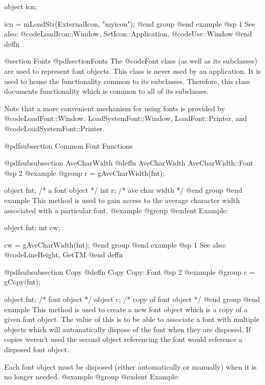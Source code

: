 object  icn;

icn = mLoadStr(ExternalIcon, "myicon");
@end group
@end example
@sp 1
See also:  @code{LoadIcon::Window, SetIcon::Application,}
        @code{Use::Window}
@end deffn





@section Fonts
@pdfsection{Fonts}
The @code{Font} class (as well as its subclasses) are used to represent
font objects.  This class is never used by an application.  It is used
to house the functionality common to its subclasses.  Therefore, this
class documents functionality which is common to all of its subclasses.

Note that a more convenient mechanism for using fonts is provided by
@code{LoadFont::Window, LoadSystemFont::Window, LoadFont::Printer},
and @code{LoadSystemFont::Printer}.






@pdfsubsection {Common Font Functions}




@pdfsubsubsection {AveCharWidth}
@deffn {AveCharWidth} AveCharWidth::Font
@sp 2
@example
@group
r = gAveCharWidth(fnt);

object   fnt;  /*  a font object  */
int      r;    /*  ave char width */
@end group
@end example
This method is used to gain access to the average character width
associated with a particular font.  
@example
@group
@exdent Example:

object  fnt;
int     cw;

cw = gAveCharWidth(fnt);
@end group
@end example
@sp 1
See also:  @code{LineHeight, GetTM}
@end deffn










@pdfsubsubsection {Copy}
@deffn {Copy} Copy::Font
@sp 2
@example
@group
c = gCopy(fnt);

object  fnt;    /*  font object          */
object  c;      /*  copy of font object  */
@end group
@end example
This method is used to create a new font object which is a copy of a
given font object.  The value of this is to be able to associate a
font with multiple objects which will automatically dispose of the
font when they are disposed.  If copies weren't used the second object
referencing the font would reference a disposed font object.

Each font object must be disposed (either automatically or manually)
when it is no longer needed.
@example
@group
@exdent Example:

